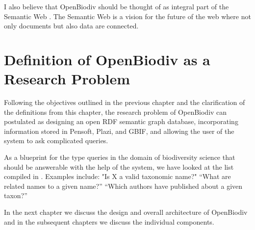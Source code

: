I also believe that OpenBiodiv should be thought of as integral part of the Semantic Web \cite{berners-lee_semantic_2001}. The Semantic Web is a vision for the future of the web where not only documents but also data are connected.

\section{Definition of OpenBiodiv as a Research Problem}

Following the objectives outlined in the previous chapter and the clarification of the definitions from this chapter, the research problem of OpenBiodiv can postulated as designing an open RDF semantic graph database, incorporating information stored in Pensoft, Plazi, and GBIF, and allowing the user of the system to ask complicated queries. 

As a blueprint for the type queries in the domain of biodiversity science that should be answerable with the help of the system, we have looked at the list compiled in \cite{pro-ibiosphere_competency_2013}. Examples include: "Is X a valid taxonomic name?" ``What are related names to a given name?'' ``Which authors have published about a given taxon?''

In the next chapter we discuss the design and overall architecture of OpenBiodiv and in the subsequent chapters we discuss the individual components.
